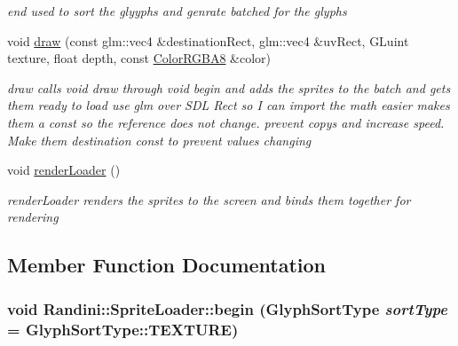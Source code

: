\begin{DoxyCompactItemize}
\begin{DoxyCompactList}\small\item\em end used to sort the glyyphs and genrate batched for the glyphs \item\end{DoxyCompactList}\item 
void \hyperlink{classRandini_1_1SpriteLoader_acfb6c713ca114db19e1b724ed08fc645}{draw} (const glm::vec4 \&destinationRect, glm::vec4 \&uvRect, GLuint texture, float depth, const \hyperlink{structRandini_1_1ColorRGBA8}{ColorRGBA8} \&color)
\begin{DoxyCompactList}\small\item\em draw calls void draw through void begin and adds the sprites to the batch and gets them ready to load use glm over SDL Rect so I can import the math easier makes them a const so the reference does not change. prevent copys and increase speed. Make them destination const to prevent values changing \item\end{DoxyCompactList}\item 
\hypertarget{classRandini_1_1SpriteLoader_ad552f49e04affcffc57936ff1b6c2cc0}{
void \hyperlink{classRandini_1_1SpriteLoader_ad552f49e04affcffc57936ff1b6c2cc0}{renderLoader} ()}
\label{classRandini_1_1SpriteLoader_ad552f49e04affcffc57936ff1b6c2cc0}

\begin{DoxyCompactList}\small\item\em renderLoader renders the sprites to the screen and binds them together for rendering \item\end{DoxyCompactList}\end{DoxyCompactItemize}


\subsection{Member Function Documentation}
\hypertarget{classRandini_1_1SpriteLoader_af4e355ad05c95b85af373d4f3d5a9c30}{
\subsubsection[{begin}]{\setlength{\rightskip}{0pt plus 5cm}void Randini::SpriteLoader::begin (GlyphSortType {\em sortType} = {\ttfamily GlyphSortType::TEXTURE})}}
\label{classRandini_1_1SpriteLoader_af4e355ad05c95b85af373d4f3d5a9c30}


